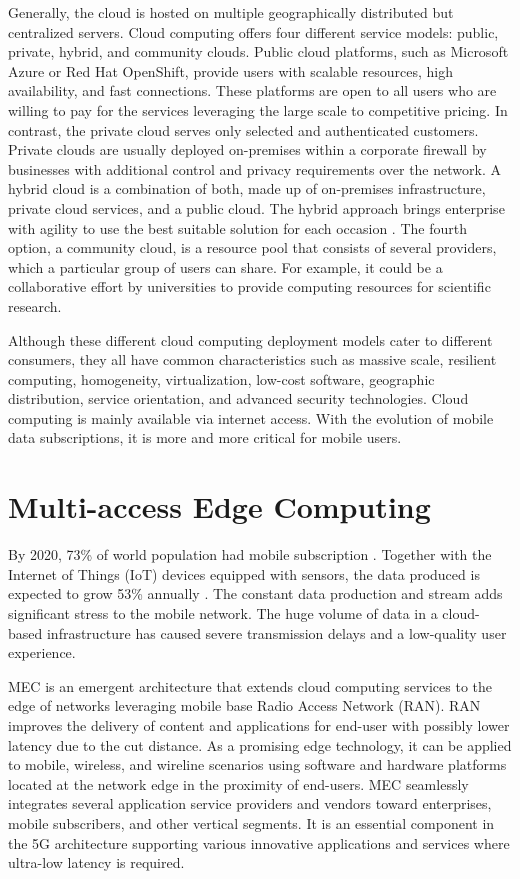 Generally, the cloud is hosted on multiple geographically distributed but centralized servers. Cloud computing offers four different service models: public, private, hybrid, and community clouds. Public cloud platforms, such as Microsoft Azure or Red Hat OpenShift, provide users with scalable resources, high availability, and fast connections. These platforms are open to all users who are willing to pay for the services leveraging the large scale to competitive pricing. In contrast, the private cloud serves only selected and authenticated customers. Private clouds are usually deployed on-premises within a corporate firewall by businesses with additional control and privacy requirements over the network. A hybrid cloud is a combination of both, made up of on-premises infrastructure, private cloud services, and a public cloud. The hybrid approach brings enterprise with agility to use the best suitable solution for each occasion \cite{NetApp}. The fourth option, a community cloud, is a resource pool that consists of several providers, which a particular group of users can share. For example, it could be a collaborative effort by universities to provide computing resources for scientific research. \cite{MicrosoftAzure}\cite{Taleb2017}\cite{Xing2012}

Although these different cloud computing deployment models cater to different consumers, they all have common characteristics such as massive scale, resilient computing, homogeneity, virtualization, low-cost software, geographic distribution, service orientation, and advanced security technologies. Cloud computing is mainly available via internet access. With the evolution of mobile data subscriptions, it is more and more critical for mobile users.

\section{Multi-access Edge Computing}

By 2020, 73\% of world population had mobile subscription \cite{StatistaMobileSubscribers}. Together with the Internet of Things (IoT) devices equipped with sensors, the data produced is expected to grow 53\% annually \cite{Ning2019}. The constant data production and stream adds significant stress to the mobile network. The huge volume of data in a cloud-based infrastructure has caused severe transmission delays and a low-quality user experience.

MEC is an emergent architecture that extends cloud computing services to the edge of networks leveraging mobile base Radio Access Network (RAN). RAN improves the delivery of content and applications for end-user with possibly lower latency due to the cut distance. As a promising edge technology, it can be applied to mobile, wireless, and wireline scenarios using software and hardware platforms located at the network edge in the proximity of end-users. MEC seamlessly integrates several application service providers and vendors toward enterprises, mobile subscribers, and other vertical segments. It is an essential component in the 5G architecture supporting various innovative applications and services where ultra-low latency is required. \cite{Abbas2018}

